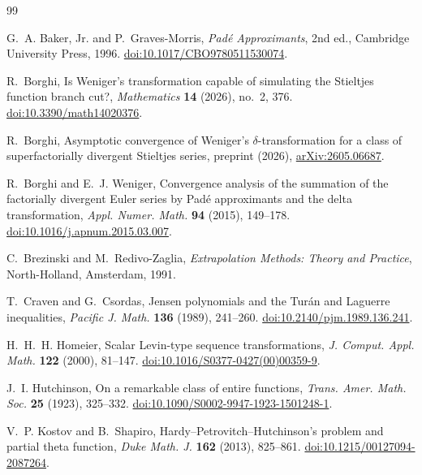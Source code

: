 \documentclass[11pt,a4paper]{article}
\theoremstyle{definition}
\theoremstyle{remark}
\begin{document}
\begin{thebibliography}{99}\small\sloppy

G.~A. Baker, Jr. and P.~Graves-Morris, \emph{Padé Approximants}, 2nd ed.,
Cambridge University Press, 1996.
\href{https://doi.org/10.1017/CBO9780511530074}{doi:10.1017/CBO9780511530074}.

R.~Borghi, Is Weniger's transformation capable of simulating the Stieltjes
function branch cut?, \emph{Mathematics} \textbf{14} (2026), no.~2, 376.
\href{https://doi.org/10.3390/math14020376}{doi:10.3390/math14020376}.

R.~Borghi, Asymptotic convergence of Weniger's $\delta$-transformation for
a class of superfactorially divergent Stieltjes series, preprint (2026),
\href{https://arxiv.org/abs/2605.06687}{arXiv:2605.06687}.

R.~Borghi and E.~J. Weniger, Convergence analysis of the summation of the
factorially divergent Euler series by Padé approximants and the delta
transformation, \emph{Appl. Numer. Math.} \textbf{94} (2015), 149--178.
\href{https://doi.org/10.1016/j.apnum.2015.03.007}{doi:10.1016/j.apnum.2015.03.007}.

C.~Brezinski and M.~Redivo-Zaglia, \emph{Extrapolation Methods: Theory and
Practice}, North-Holland, Amsterdam, 1991.

T.~Craven and G.~Csordas, Jensen polynomials and the Turán and Laguerre
inequalities, \emph{Pacific J. Math.} \textbf{136} (1989), 241--260.
\href{https://doi.org/10.2140/pjm.1989.136.241}{doi:10.2140/pjm.1989.136.241}.

H.~H.~H. Homeier, Scalar Levin-type sequence transformations, \emph{J.
Comput. Appl. Math.} \textbf{122} (2000), 81--147.
\href{https://doi.org/10.1016/S0377-0427(00)00359-9}{doi:10.1016/S0377-0427(00)00359-9}.

J.~I. Hutchinson, On a remarkable class of entire functions, \emph{Trans.
Amer. Math. Soc.} \textbf{25} (1923), 325--332.
\href{https://doi.org/10.1090/S0002-9947-1923-1501248-1}{doi:10.1090/S0002-9947-1923-1501248-1}.

V.~P. Kostov and B.~Shapiro, Hardy--Petrovitch--Hutchinson's problem and
partial theta function, \emph{Duke Math. J.} \textbf{162} (2013), 825--861.
\href{https://doi.org/10.1215/00127094-2087264}{doi:10.1215/00127094-2087264}.


\end{thebibliography}
\end{document}
